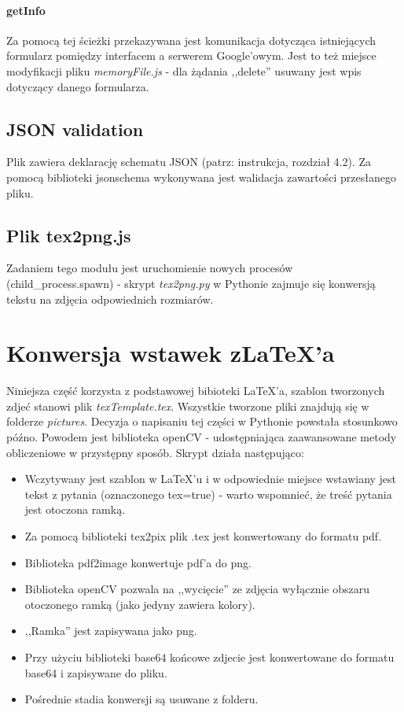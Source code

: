 \paragraph{getInfo} Za pomocą tej ścieżki  przekazywana jest komunikacja dotycząca istniejących formularz pomiędzy interfacem a serwerem Google'owym. Jest to też miejsce modyfikacji pliku \textit{memoryFile.js} - dla żądania ,,delete'' usuwany jest wpis dotyczący danego formularza.
\subsection{JSON validation} Plik zawiera deklarację schematu JSON (patrz: instrukcja, rozdział 4.2). Za pomocą biblioteki jsonschema wykonywana jest walidacja zawartości przesłanego pliku.
\subsection{Plik tex2png.js} Zadaniem tego modułu jest uruchomienie nowych procesów (child\_process.spawn)  - skrypt \textit{tex2png.py} w Pythonie zajmuje się konwersją tekstu na zdjęcia odpowiednich rozmiarów.
\section{Konwersja wstawek z\LaTeX{}'a}
Niniejsza część korzysta z podstawowej bibioteki \LaTeX{}'a, szablon tworzonych zdjeć stanowi plik \textit{texTemplate.tex}. Wszystkie tworzone pliki znajdują się w folderze \textit{pictures}.
\ind Decyzja o napisaniu tej części w Pythonie powstała stosunkowo późno. Powodem jest biblioteka openCV - udostępniająca zaawansowane metody obliczeniowe w przystępny sposób. Skrypt działa następująco:
\begin{itemize}
\item Wczytywany jest szablon w \LaTeX{}'u i w odpowiednie miejsce wstawiany jest tekst z pytania (oznaczonego tex=true) - warto wspomnieć, że treść pytania jest otoczona ramką.
\item Za pomocą biblioteki tex2pix plik .tex jest konwertowany do formatu pdf.
\item Biblioteka pdf2image konwertuje pdf'a do png.
\item Biblioteka openCV pozwala na ,,wycięcie'' ze zdjęcia wyłącznie obszaru otoczonego ramką (jako jedyny zawiera kolory).
\item ,,Ramka'' jest zapisywana jako png.
\item Przy użyciu biblioteki base64 końcowe zdjecie jest konwertowane do formatu base64 i zapisywane do pliku.
\item Pośrednie stadia konwersji są usuwane z folderu.
\end{itemize}
